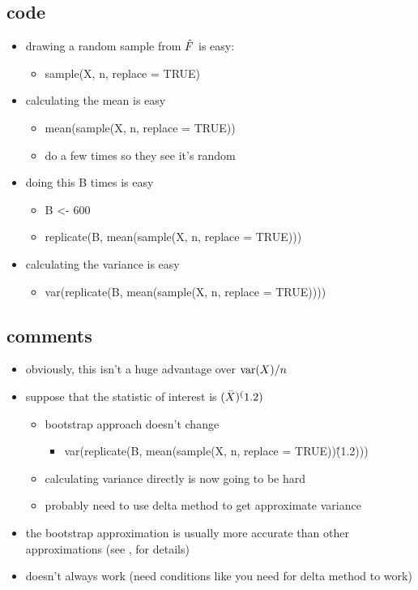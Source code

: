 \subsection{code}

\begin{itemize}
\item drawing a random sample from $\hat{F}$ is easy:
\begin{itemize}
\item sample(X, n, replace = TRUE)
\end{itemize}
\item calculating the mean is easy
\begin{itemize}
\item mean(sample(X, n, replace = TRUE))
\item do a few times so they see it's random
\end{itemize}
\item doing this B times is easy
\begin{itemize}
\item B <- 600
\item replicate(B, mean(sample(X, n, replace = TRUE)))
\end{itemize}
\item calculating the variance is easy
\begin{itemize}
\item var(replicate(B, mean(sample(X, n, replace = TRUE))))
\end{itemize}
\end{itemize}

\subsection{comments}

\begin{itemize}
\item obviously, this isn't a huge advantage over
  $\operatorname{var}(X) / n$
\item suppose that the statistic of interest is $(\bar{X})^(1.2)$
\begin{itemize}
\item bootstrap approach doesn't change
\begin{itemize}
\item var(replicate(B, mean(sample(X, n, replace = TRUE))\^(1.2)))
\end{itemize}
\item calculating variance directly is now going to be hard
\item probably need to use delta method to get approximate variance
\end{itemize}
\item the bootstrap approximation is usually more accurate than
       other approximations (see \citealp{Hal91}, for details)
\item doesn't always work (need conditions like you need for delta
       method to work)
\end{itemize}

